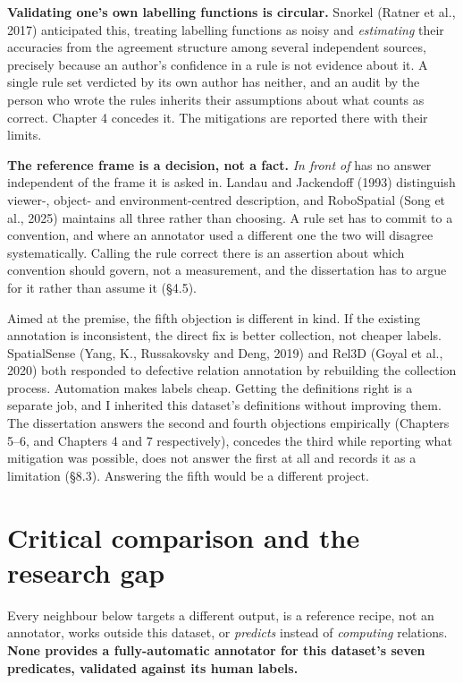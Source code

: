 \textbf{Validating one's own labelling functions is circular.} Snorkel (Ratner et al., 2017) anticipated this, treating labelling functions as noisy and \textit{estimating} their accuracies from the agreement structure among several independent sources, precisely because an author's confidence in a rule is not evidence about it. A single rule set verdicted by its own author has neither, and an audit by the person who wrote the rules inherits their assumptions about what counts as correct. Chapter 4 concedes it. The mitigations are reported there with their limits.

\textbf{The reference frame is a decision, not a fact.} \textit{In front of} has no answer independent of the frame it is asked in. Landau and Jackendoff (1993) distinguish viewer-, object- and environment-centred description, and RoboSpatial (Song et al., 2025) maintains all three rather than choosing. A rule set has to commit to a convention, and where an annotator used a different one the two will disagree systematically. Calling the rule correct there is an assertion about which convention should govern, not a measurement, and the dissertation has to argue for it rather than assume it (\S{}4.5).

Aimed at the premise, the fifth objection is different in kind. If the existing annotation is inconsistent, the direct fix is better collection, not cheaper labels. SpatialSense (Yang, K., Russakovsky and Deng, 2019) and Rel3D (Goyal et al., 2020) both responded to defective relation annotation by rebuilding the collection process. Automation makes labels cheap. Getting the definitions right is a separate job, and I inherited this dataset's definitions without improving them. The dissertation answers the second and fourth objections empirically (Chapters 5--6, and Chapters 4 and 7 respectively), concedes the third while reporting what mitigation was possible, does not answer the first at all and records it as a limitation (\S{}8.3). Answering the fifth would be a different project.

\section{Critical comparison and the research gap}

Every neighbour below targets a different output, is a reference recipe, not an annotator, works outside this dataset, or \textit{predicts} instead of \textit{computing} relations. \textbf{None provides a fully-automatic annotator for this dataset's seven predicates, validated against its human labels.}

